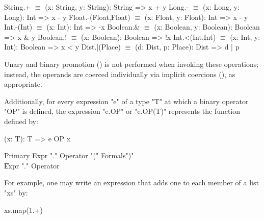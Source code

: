 \begin{xtenmath}
String.+             $\equiv$ (x: String, y: String): String => x + y
Long.-               $\equiv$ (x: Long, y: Long): Int => x - y
Float.-(Float,Float) $\equiv$ (x: Float, y: Float): Int => x - y
Int.-(Int)           $\equiv$ (x: Int): Int => -x
Boolean.&            $\equiv$ (x: Boolean, y: Boolean): Boolean => x & y
Boolean.!            $\equiv$ (x: Boolean): Boolean => !x
Int.<(Int,Int)       $\equiv$ (x: Int, y: Int): Boolean => x < y
Dist.|(Place)        $\equiv$ (d: Dist, p: Place): Dist => d | p
\end{xtenmath}

Unary and binary promotion () is not performed
when invoking these
operations; instead, the operands are coerced individually via implicit
coercions (), as appropriate.

Additionally, for every expression \xcd"e" of a type \xcd"T" at which a binary
operator \xcd"OP" is defined, the expression \xcd"e.OP" or
\xcd"e.OP(T)" represents the function
defined by:

\begin{xten}
(x: T): T => { e OP x }
\end{xten}

\begin{grammar}
Primary \: Expr \xcd"." Operator \xcd"(" Formals\opt \xcd")" \\
        \| Expr \xcd"." Operator \\
\end{grammar}



For example,
one may write an expression that adds one to each member of a
list \xcd"xs" by:

\begin{xten}
xs.map(1.+)
\end{xten}


